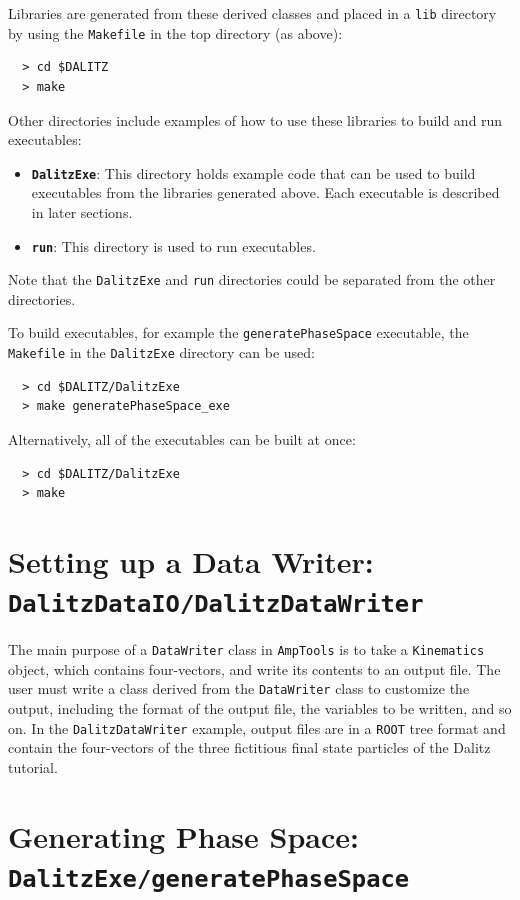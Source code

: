 \documentclass[11pt]{article}
\begin{document}
Libraries are generated from these derived classes and placed in a {\tt lib} directory by using the {\tt Makefile} in the top directory (as above):
\begin{verbatim}
  > cd $DALITZ
  > make
\end{verbatim}

Other directories include examples of how to use these libraries to build and run executables:
\begin{itemize}
\item {\tt \bf DalitzExe}:  This directory holds example code that can be used to build executables from the libraries generated above.  Each executable is described in later sections.
\item {\tt \bf run}:  This directory is used to run executables.
\end{itemize}
Note that the {\tt DalitzExe} and {\tt run} directories could be separated from the other directories.  

To build executables, for example the {\tt generatePhaseSpace} executable, the {\tt Makefile} in the {\tt DalitzExe} directory can be used:
\begin{verbatim}
  > cd $DALITZ/DalitzExe
  > make generatePhaseSpace_exe
\end{verbatim}

Alternatively, all of the executables can be built at once:
\begin{verbatim}
  > cd $DALITZ/DalitzExe
  > make
\end{verbatim}

\section{Setting up a Data Writer: \\ 
{\tt DalitzDataIO/DalitzDataWriter}}
\label{sec:dw}

The main purpose of a {\tt DataWriter} class in {\tt AmpTools} is to take a {\tt Kinematics} object, which contains four-vectors, and write its contents to an output file.  The user must write a class derived from the {\tt DataWriter} class to customize the output, including the format of the output file, the variables to be written, and so on.  In the {\tt DalitzDataWriter} example, output files are in a {\tt ROOT} tree format and contain the four-vectors of the three fictitious final state particles of the Dalitz tutorial.

\section{Generating Phase Space: \\  
{\tt DalitzExe/generatePhaseSpace}}
\label{sec:ps}
\end{document}
